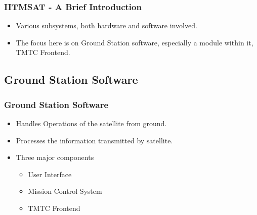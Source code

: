 \documentclass{beamer}
\begin{document}

\begin{frame}
\frametitle{IITMSAT - A Brief Introduction}
\pause
\begin{itemize}
\item Various subsystems, both hardware and software involved.
\pause
\item The focus here is on Ground Station  software, especially a module within it, TMTC Frontend.
\end{itemize}
\end{frame}

\subsection{Ground Station Software}
\begin{frame}
\frametitle{Ground Station Software}
\pause
\begin{itemize}
\item Handles Operations of the satellite from ground.
\pause
\item Processes the information transmitted by satellite.
\pause
\item Three major components 
\begin{itemize}
\item User Interface
\item Mission Control System
\item TMTC Frontend
\end{itemize}
\end{itemize}

\end{frame}

\end{document}
